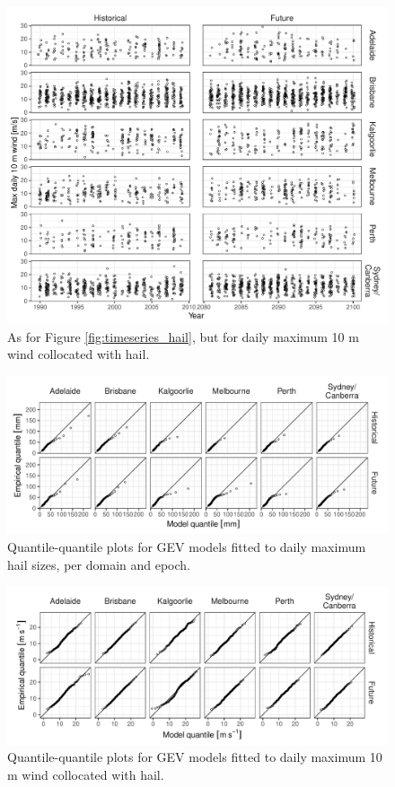 \documentclass[draft,grl]{agutexSI2019}
\begin{document}
\begin{figure}[!ht]
    \includegraphics[width=\textwidth]{figures/timeseries_wind}
    \caption{As for Figure \ref{fig:timeseries_hail}, but for daily maximum 10 m wind collocated with hail.}
    \label{fig:timeseries_wind}
\end{figure}

\begin{figure}[!ht]
    \includegraphics[width=\textwidth]{figures/qq_hail}
    \caption{Quantile-quantile plots for GEV models fitted to daily maximum hail sizes, per domain and epoch.}
    \label{fig:qq_hail}
\end{figure}

\begin{figure}[!ht]
    \includegraphics[width=\textwidth]{figures/qq_wind}
    \caption{Quantile-quantile plots for GEV models fitted to daily maximum 10 m wind collocated with hail.}
    \label{fig:qq_wind}
\end{figure}
\end{document}
